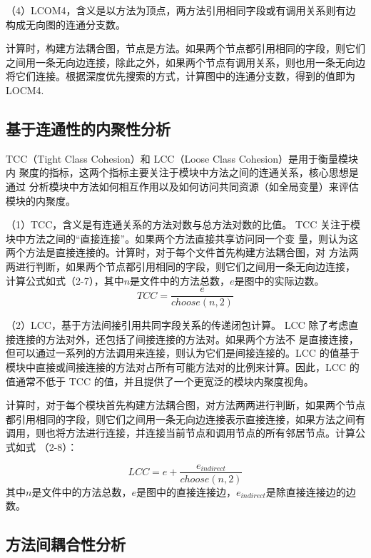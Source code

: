 （4）LCOM4，含义是以方法为顶点，两方法引用相同字段或有调用关系则有边构成无向图的连通分支数\cite{1995Measuring}。

计算时，构建方法耦合图，节点是方法。如果两个节点都引用相同的字段，则它们
之间用一条无向边连接，除此之外，如果两个节点有调用关系，则也用一条无向边将它们连接。根据深度优先搜索的方式，计算图中的连通分支数，得到的值即为LOCM4.

\subsection{基于连通性的内聚性分析}
TCC（Tight Class Cohesion）和 LCC（Loose Class Cohesion）是用于衡量模块内
聚度的指标，这两个指标主要关注于模块中方法之间的连通关系，核心思想是通过
分析模块中方法如何相互作用以及如何访问共同资源（如全局变量）来评估模块的内聚度。


（1）TCC，含义是有连通关系的方法对数与总方法对数的比值\cite{1995Cohesion}。
TCC 关注于模块中方法之间的“直接连接”。如果两个方法直接共享访问同一个变
量，则认为这两个方法是直接连接的。计算时，对于每个文件首先构建方法耦合图，对
方法两两进行判断，如果两个节点都引用相同的字段，则它们之间用一条无向边连接，
计算公式如式（2-7），其中\(n\)是文件中的方法总数，\(e\)是图中的实际边数。
\begin{equation}
{TCC} = \frac{e}{choose(n,2)}
\end{equation}

（2）LCC，基于方法间接引用共同字段关系的传递闭包计算\cite{1995Cohesion}。
LCC 除了考虑直接连接的方法对外，还包括了间接连接的方法对。如果两个方法不
是直接连接，但可以通过一系列的方法调用来连接，则认为它们是间接连接的。LCC 的值基于模块中直接或间接连接的方法对占所有可能方法对的比例来计算。因此，LCC 的值通常不低于 TCC 的值，并且提供了一个更宽泛的模块内聚度视角。


计算时，对于每个模块首先构建方法耦合图，对方法两两进行判断，如果两个节点
都引用相同的字段，则它们之间用一条无向边连接表示直接连接，如果方法之间有调用，则也将方法进行连接，并连接当前节点和调用节点的所有邻居节点。计算公式如式 （2-8）：

\begin{equation}
{LCC=e+\frac{e_{indirect}}{choose(n,2)}}
\end{equation}
其中\(n\)是文件中的方法总数，\(e\)是图中的直接连接边，\(e_{indirect}\)是除直接连接边的边数。


\subsection{方法间耦合性分析}

